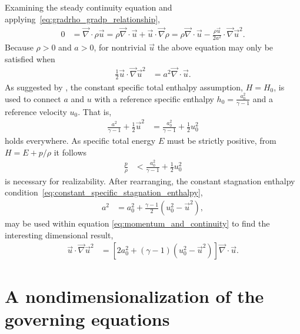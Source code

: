 \documentclass[letterpaper,11pt,nointlimits,reqno]{amsart}
\begin{document}
Examining the steady continuity equation and
applying~\eqref{eq:gradrho_gradp_relationship},
\begin{align}
  0 &= \vec{\nabla}\cdot\rho\vec{u}
     = \rho\vec{\nabla}\cdot\vec{u} + \vec{u}\cdot\vec{\nabla}\rho
     = \rho\vec{\nabla}\cdot\vec{u}
     - \frac{\rho\vec{u}}{2a^2} \cdot \vec{\nabla}\vec{u}^2
\label{eq:continuity}
.
\end{align}
Because $\rho>0$ and $a>0$, for nontrivial $\vec{u}$ the above
equation may only be satisfied when
\begin{align}
       \frac{1}{2} \vec{u}\cdot \vec{\nabla}\vec{u}^2
    &= a^2 \vec{\nabla}\cdot\vec{u}
.
\label{eq:momentum_and_continuity}
\end{align}
As suggested by \citeauthor{Saad2011Coordinate}, the constant specific total
enthalpy assumption, $H = H_0$, is used to connect $a$ and $u$ with a reference
specific enthalpy $h_0 = \frac{a_0^2}{\gamma-1}$ and a reference velocity $u_0$.
That is,
\begin{align}
       \frac{a^2  }{\gamma-1} + \frac{1}{2} \vec{u}^2
    &= \frac{a_0^2}{\gamma-1} + \frac{1}{2} u_0^2
\label{eq:constant_specific_stagnation_enthalpy}
\end{align}
holds everywhere.  As specific total energy $E$ must be strictly positive, from
$H = E + p / \rho$ it follows
\begin{align}
    \frac{p}{\rho} &< \frac{a_0^2}{\gamma-1} + \frac{1}{2}u_0^2
\label{eq:constant_specific_stagnation_enthalpy_realizablity}
\end{align}
is necessary for realizability. After rearranging, the constant stagnation
enthalpy condition~\eqref{eq:constant_specific_stagnation_enthalpy},
\begin{align}
    a^2 &= a_0^2 + \frac{\gamma-1}{2} \left(u_0^2 - \vec{u}^2\right)
\label{eq:stagnation_sound}
,
\end{align}
may be used within equation \eqref{eq:momentum_and_continuity} to find the
interesting dimensional result,
\begin{align}
       \vec{u}\cdot \vec{\nabla}\vec{u}^2
    &= \left[
          2 a_0^2
        + \left(\gamma-1\right) \left(u_0^2 - \vec{u}^2\right)
       \right]\vec{\nabla}\cdot\vec{u}
\label{eq:cpfgibbs_dim}
.
\end{align}

\section{A nondimensionalization of the governing equations}
\end{document}
